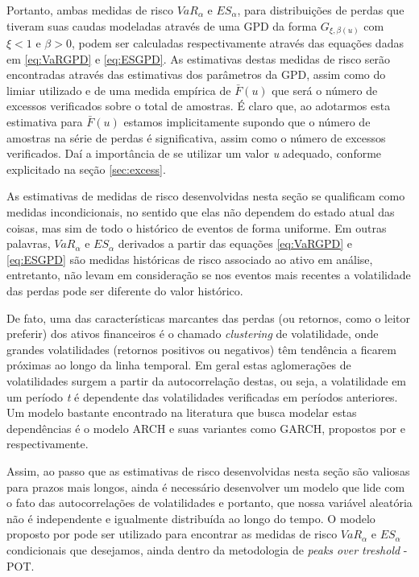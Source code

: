 \documentclass[review]{elsarticle}
\theoremstyle{definition}
\begin{document}
Portanto, ambas medidas de risco $VaR_\alpha$ e $ES_\alpha$, para distribuições de perdas que tiveram suas caudas modeladas através de uma GPD da forma $G_{\xi, \beta(u)}$ com $\xi <1 \text{ e } \beta > 0$, podem ser calculadas respectivamente através das equações dadas em \eqref{eq:VaRGPD} e \eqref{eq:ESGPD}. As estimativas destas medidas de risco serão encontradas através das estimativas dos parâmetros da GPD, assim como do limiar utilizado e de uma medida empírica de $\bar{F}(u)$ que será o número de excessos verificados sobre o total de amostras. É claro que, ao adotarmos esta estimativa para $\bar{F}(u)$ estamos implicitamente supondo que o número de amostras na série de perdas é significativa, assim como o número de excessos verificados. Daí a importância de se utilizar um valor \emph{u} adequado, conforme explicitado na seção \ref{sec:excess}. 

As estimativas de medidas de risco desenvolvidas nesta seção se qualificam como medidas incondicionais, no sentido que elas não dependem do estado atual das coisas, mas sim de todo o histórico de eventos de forma uniforme. Em outras palavras, $VaR_\alpha \text{ e } ES_\alpha$ derivados a partir das equações \eqref{eq:VaRGPD} e \eqref{eq:ESGPD} são medidas históricas de risco associado ao ativo em análise, entretanto, não levam em consideração se nos eventos mais recentes a volatilidade das perdas pode ser diferente do valor histórico.

De fato, uma das características marcantes das perdas (ou retornos, como o leitor preferir) dos ativos financeiros é o chamado \emph{clustering} de volatilidade, onde grandes volatilidades (retornos positivos ou negativos) têm tendência a ficarem próximas ao longo da linha temporal. Em geral estas aglomerações de volatilidades surgem a partir da autocorrelação destas, ou seja, a volatilidade em um período \emph{t} é dependente das volatilidades verificadas em períodos anteriores. Um modelo bastante encontrado na literatura que busca modelar estas dependências é o modelo ARCH e suas variantes como GARCH, propostos por \cite{Engle1982} e \cite{Bollerslev1986} respectivamente.

Assim, ao passo que as estimativas de risco desenvolvidas nesta seção são valiosas para prazos mais longos, ainda é necessário desenvolver um modelo que lide com o fato das autocorrelações de volatilidades e portanto, que nossa variável aleatória não é independente e igualmente distribuída ao longo do tempo. O modelo proposto por \cite{McNeil2000} pode ser utilizado para encontrar as medidas de risco $VaR_\alpha$ e $ES_\alpha$ condicionais que desejamos, ainda dentro da metodologia de \emph{peaks over treshold} - POT.
\end{document}
